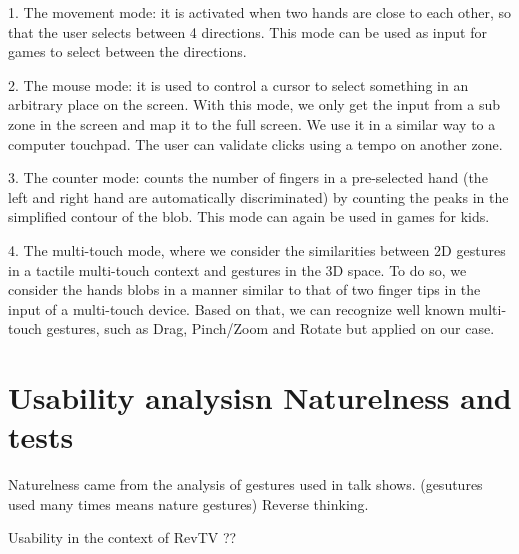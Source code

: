 \documentclass{llncs}
\begin{document}
1. The movement mode:
it is activated when two hands are close to each other, so that the user selects between 4 directions. This mode can be used as input for games to select between the directions.

2. The mouse mode:
it is used to control a cursor to select something in an arbitrary place on the screen. With this mode, we only get the input from a sub zone in the screen and map it to the full screen. We use it in a similar way to a computer touchpad.
The user can validate clicks using a tempo on another zone.

3. The counter mode: counts the number of fingers in a pre-selected hand (the left and right hand are automatically discriminated) by counting the peaks in the simplified contour of the blob. This mode can again be used in games for kids.

4. The multi-touch mode, where we consider the similarities between 2D gestures in a tactile multi-touch context and gestures in the 3D space. To do so, we consider the hands blobs in a manner similar to that of two finger tips in the input of a multi-touch device. Based on that, we can recognize well known multi-touch gestures, such as Drag, Pinch/Zoom and Rotate but applied on our case.


\section{Usability analysisn Naturelness and tests}

Naturelness came from the analysis of gestures used in talk shows.
(gesutures used many times means nature gestures)
Reverse thinking.

Usability in the context of RevTV ??



\end{document}
